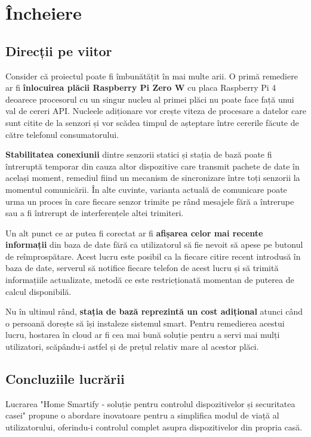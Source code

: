 \chapter*{Încheiere} 

\section*{Direcții pe viitor}

Consider că proiectul poate fi îmbunătățit în mai multe arii. O primă remediere ar fi \textbf{înlocuirea plăcii Raspberry Pi Zero W} cu placa Raspberry Pi 4 deoarece procesorul cu un singur nucleu al primei plăci nu poate face față unui val de cereri API. Nucleele adiționare vor crește viteza de procesare a datelor care sunt citite de la senzori și vor scădea timpul de așteptare între cererile făcute de către telefonul consumatorului.

\textbf{Stabilitatea conexiunii} dintre senzorii statici și stația de bază poate fi întreruptă temporar din cauza altor dispozitive care transmit pachete de date în același moment, remediul fiind un mecanism de sincronizare între toți senzorii la momentul comunicării. În alte cuvinte, varianta actuală de comunicare poate urma un proces în care fiecare senzor trimite pe rând mesajele fără a întrerupe sau a fi întrerupt de interferențele altei trimiteri.

Un alt punct ce ar putea fi corectat ar fi \textbf{afișarea celor mai recente informații} din baza de date fără ca utilizatorul să fie nevoit să apese pe butonul de reîmprospătare. Acest lucru este posibil ca la fiecare citire recent introdusă în baza de date, serverul să notifice fiecare telefon de acest lucru și să trimită informațiile actualizate, metodă ce este restricționată momentan de puterea de calcul disponibilă.

Nu în ultimul rând, \textbf{stația de bază reprezintă un cost adițional} atunci când o persoană dorește să își instaleze sistemul smart. Pentru remedierea acestui lucru, hostarea în cloud ar fi cea mai bună soluție pentru a servi mai mulți utilizatori, scăpându-i astfel și de prețul relativ mare al acestor plăci.

\section*{Concluziile lucrării}

Lucrarea "Home Smartify - soluție pentru controlul dispozitivelor și securitatea casei" propune o abordare inovatoare pentru a simplifica modul de viață al utilizatorului, oferindu-i controlul complet asupra dispozitivelor din propria casă. 

